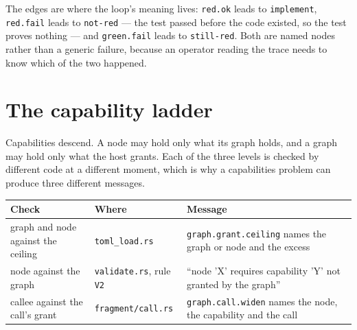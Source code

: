 The edges are where the loop's meaning lives: \texttt{red.ok} leads to \texttt{implement},
\texttt{red.fail} leads to \texttt{not-red} --- the test passed before the code existed, so the
test proves nothing --- and \texttt{green.fail} leads to \texttt{still-red}. Both are named
nodes rather than a generic failure, because an operator reading the trace needs to know which of
the two happened.

\section{The capability ladder}

Capabilities descend. A node may hold only what its graph holds, and a graph may hold only what the
host grants. Each of the three levels is checked by different code at a different moment, which is
why a capabilities problem can produce three different messages.

\begin{center}
\end{center}

\begin{center}
\footnotesize
\begin{tabular}{@{}p{}p{}p{}@{}}
	\toprule
	\textbf{Check} & \textbf{Where} & \textbf{Message} \\
	\midrule
	graph and node against the ceiling & \texttt{toml\_load.rs} & \texttt{graph.grant.ceiling} names
	the graph or node and the excess \\
	node against the graph & \texttt{validate.rs}, rule \texttt{V2} & \enquote{node 'X' requires
	capability 'Y' not granted by the graph} \\
	callee against the call's grant & \texttt{fragment/call.rs} & \texttt{graph.call.widen} names the
	node, the capability and the call \\
	\bottomrule
\end{tabular}
\end{center}

